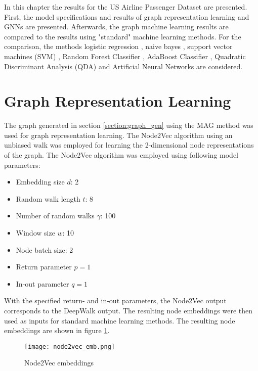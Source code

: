   
  In this chapter the results for the US Airline Passenger Dataset are
  presented. First, the model specifications and results of graph
  representation learning and GNNs are presented. Afterwards, the graph machine
  learning results are compared to the results using "standard" machine
  learning methods. For the comparison, the methods logistic
  regression \citep{cramer2002origins}, naive bayes \citep{zhang2004bayes},
  support vector machines (SVM) \citep{platt1999probabilistic,chang2011libsvm},
  Random Forest Classifier \citep{breiman2001random}, AdaBoost Classifier
  \citep{freund1997decision,hastie2009multi}, Quadratic Discriminant Analysis
  (QDA) \citep{tharwat2016linear} and Artificial Neural Networks
  \citep{mcculloch1943logical} are considered.

  \section{Graph Representation Learning}

  The graph generated in section \ref{section:graph_gen} using the MAG method
  was used for graph representation learning. The Node2Vec algorithm using an
  unbiased walk was employed for learning the 2-dimensional node representations 
  of the graph. The Node2Vec algorithm was employed using following model 
  parameters:

  \begin{itemize}
    \setlength\itemsep{0.1em}
    \item Embedding size $d$: 2
    \item Random walk length $t$: 8
    \item Number of random walks $\gamma$: 100
    \item Window size $w$: 10
    \item Node batch size: 2
    \item Return parameter $p=1$
    \item In-out parameter $q=1$
  \end{itemize}

  \noindent With the specified return- and in-out parameters, the Node2Vec
  output corresponds to the DeepWalk output. The resulting node embeddings were
  then used as inputs for standard machine learning methods. The resulting node 
  embeddings are shown in figure \ref{fig:node2vec}. 

  \begin{figure}[h]
		\centering
		\texttt{[image: node2vec\_emb.png]}
		\caption{Node2Vec embeddings}
        \label{fig:node2vec}
  \end{figure}

